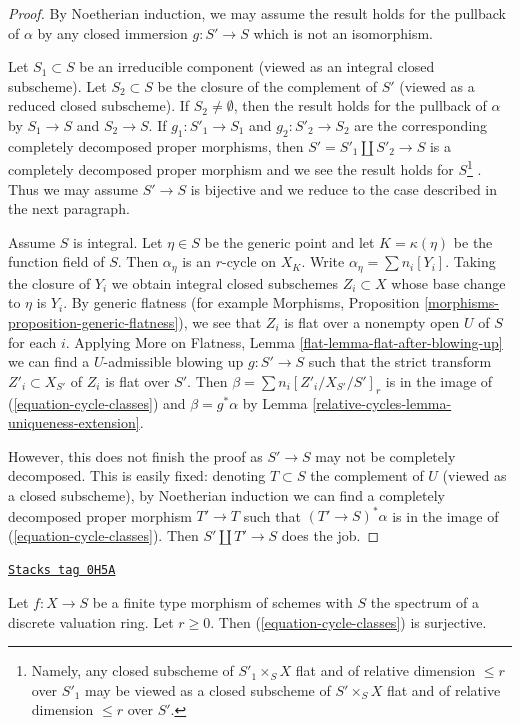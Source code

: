 \begin{proof}
By Noetherian induction, we may assume the result holds for the pullback of
$\alpha$ by any closed immersion $g : S' \to S$ which is not an isomorphism.

\medskip\noindent
Let $S_1 \subset S$ be an irreducible component (viewed as an integral closed
subscheme). Let $S_2 \subset S$ be the closure of the complement of $S'$
(viewed as a reduced closed subscheme). If $S_2 \not = \emptyset$, then
the result holds for the pullback of $\alpha$ by $S_1 \to S$ and $S_2 \to S$.
If $g_1 : S'_1 \to S_1$ and $g_2 : S'_2 \to S_2$
are the corresponding completely decomposed proper morphisms,
then $S' = S'_1 \amalg S'_2 \to S$
is a completely decomposed proper morphism and
we see the result holds for $S$\footnote{Namely, any closed
subscheme of $S'_1 \times_S X$ flat and of relative dimension
$\leq r$ over $S'_1$ may be viewed as a closed subscheme of $S' \times_S X$
flat and of relative dimension $\leq r$ over $S'$.}
. Thus we may assume $S' \to S$ is bijective
and we reduce to the case described in the next paragraph.

\medskip\noindent
Assume $S$ is integral. Let $\eta \in S$ be the generic point
and let $K = \kappa(\eta)$ be the function field of $S$.
Then $\alpha_\eta$ is an $r$-cycle on $X_K$.
Write $\alpha_\eta = \sum n_i[Y_i]$.
Taking the closure of $Y_i$ we obtain integral closed subschemes
$Z_i \subset X$ whose base change to $\eta$ is $Y_i$.
By generic flatness (for example Morphisms,
Proposition \ref{morphisms-proposition-generic-flatness}),
we see that $Z_i$ is flat over a nonempty open $U$ of $S$ for each $i$.
Applying More on Flatness, Lemma \ref{flat-lemma-flat-after-blowing-up}
we can find a $U$-admissible blowing up $g : S' \to S$
such that the strict transform $Z'_i \subset X_{S'}$
of $Z_i$ is flat over $S'$. Then $\beta = \sum n_i[Z'_i/X_{S'}/S']_r$
is in the image of (\ref{equation-cycle-classes}) and $\beta = g^*\alpha$
by Lemma \ref{relative-cycles-lemma-uniqueness-extension}.

\medskip\noindent
However, this does not finish the proof as $S' \to S$ may not be
completely decomposed. This is easily fixed: denoting $T \subset S$
the complement of $U$ (viewed as a closed subscheme), by Noetherian
induction we can find a completely decomposed proper morphism
$T' \to T$ such that $(T' \to S)^*\alpha$
is in the image of (\ref{equation-cycle-classes}). Then
$S' \amalg T' \to S$ does the job.
\end{proof}

\begin{lemma}
\label{relative-cycles-lemma-get-cycles-dvr}
\href{https://stacks.math.columbia.edu/tag/0H5A}{\texttt{Stacks tag 0H5A}}

Let $f : X \to S$ be a finite type morphism of schemes with $S$
the spectrum of a discrete valuation ring. Let $r \geq 0$.
Then (\ref{equation-cycle-classes}) is surjective.
\end{lemma}

